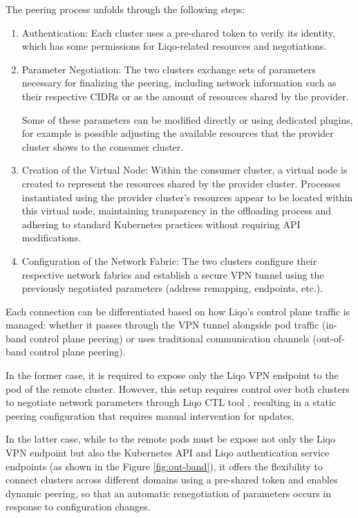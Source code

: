 The peering process unfolds through the following steps:
\begin{enumerate}
\item Authentication: Each cluster uses a pre-shared token to verify its identity, which has some permissions for Liqo-related resources and negotiations.
\item Parameter Negotiation: The two clusters exchange sets of parameters necessary for finalizing the peering, including network information such as their respective CIDRs or as the amount of resources shared by the provider. 

Some of these parameters can be modified directly or using dedicated plugins, for example is possible adjusting the available resources that the provider cluster shows to the consumer cluster.
\item Creation of the Virtual Node: Within the consumer cluster, a virtual node is created to represent the resources shared by the provider cluster. Processes instantiated using the provider cluster's resources appear to be located within this virtual node, maintaining transparency in the offloading process and adhering to standard Kubernetes practices without requiring API modifications.
\item Configuration of the Network Fabric: The two clusters configure their respective network fabrics and establish a secure VPN tunnel using the previously negotiated parameters (address remapping, endpoints, etc.).
\end{enumerate}
Each connection can be differentiated based on how Liqo's control plane traffic is managed: whether it passes through the VPN tunnel alongside pod traffic (in-band control plane peering) or uses traditional communication channels (out-of-band control plane peering). 

In the former case, it is required to expose only the Liqo VPN endpoint to the pod of the remote cluster. However, this setup requires control over both clusters to negotiate network parameters through Liqo CTL tool \cite{l1-1}, resulting in a static peering configuration that requires manual intervention for updates. 

In the latter case, while to the remote pods must be expose not only the Liqo VPN endpoint but also the Kubernetes API and Liqo authentication service endpoints (as shown in the Figure \ref{fig:out-band}), it offers the flexibility to connect clusters across different domains using a pre-shared token and enables dynamic peering, so that an automatic renegotiation of parameters occurs in response to configuration changes. 

